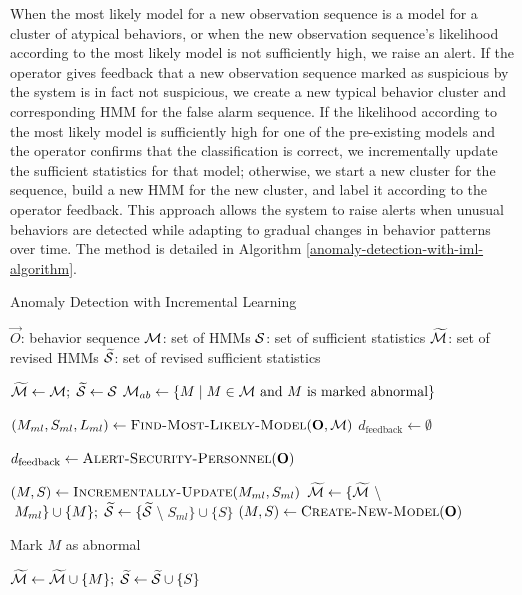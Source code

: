 When the most likely model for a new observation sequence is a model
for a cluster of atypical behaviors, or when the new observation
sequence's likelihood according to the most likely model is not
sufficiently high, we raise an alert. If the operator gives feedback
that a new observation sequence marked as suspicious by the system is
in fact not suspicious, we create a new typical behavior cluster and
corresponding HMM for the false alarm sequence. If the likelihood
according to the most likely model is sufficiently high for one of the
pre-existing models and the operator confirms that the classification
is correct, we incrementally update the sufficient statistics for that
model; otherwise, we start a new cluster for the sequence, build a new
HMM for the new cluster, and label it according to the operator
feedback. This approach allows the system to raise alerts when unusual
behaviors are detected while adapting to gradual changes in behavior
patterns over time. The method is detailed in Algorithm
\ref{anomaly-detection-with-iml-algorithm}.

\begin{algorithm}
  \caption{Anomaly Detection with Incremental Learning}
  \label{anomaly-detection-with-iml-algorithm}
  \begin{algorithmic}
    \REQUIRE $\vec{O}$: behavior sequence 
    \REQUIRE ${\cal M}$: set of HMMs 
    \REQUIRE ${\cal S}$: set of sufficient statistics 
    \ENSURE $\widetilde{\cal M}$: set of revised HMMs 
    \ENSURE $\widetilde{\cal S}$: set of revised sufficient statistics

    \STATE $\widetilde{\cal M} \gets {\cal M}; \; \widetilde{\cal S} \gets {\cal S}$
    \STATE ${\cal M}_{ab} \gets \{ M \mid M \in {\cal M} \text{~and $M$ is marked abnormal} \}$ 

    \STATE $( M_{ml}, S_{ml}, L_{ml} ) \gets
    \textsc{Find-Most-Likely-Model}(\vec{O}, {\cal M})$ 
    \STATE $d_{\text{feedback}} \gets \emptyset$

      \STATE $d_{\text{feedback}} \gets \textsc{Alert-Security-Personnel}(\vec{O})$
    \ENDIF

      \STATE $( M, S ) \gets \textsc{Incrementally-Update}(M_{ml}, S_{ml})$ 
      \STATE $\widetilde{\cal M} \gets \{ \widetilde{\cal
      M}\;$\textbackslash$\;M_{ml} \} \cup \{ M \}; \; \widetilde{\cal S} \gets \{ \widetilde{\cal
      S}\;$\textbackslash$\;S_{ml} \} \cup \{ S \}$ 
    \ELSE 
      \STATE $( M, S ) \gets \textsc{Create-New-Model}(\vec{O})$

        \STATE Mark $M$ as abnormal 
      \ENDIF

      \STATE $\widetilde{\cal M} \gets \widetilde{\cal M} \cup \{ M \}; \; \widetilde{\cal S} \gets \widetilde{\cal S} \cup \{ S \}$ 
    \ENDIF
  \end{algorithmic}
\end{algorithm}


